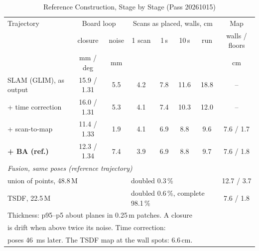 \begin{table}[!t]
\centering
\caption{Reference Construction, Stage by Stage (Pass 20261015)}
\label{tab:refmap_stages}
\footnotesize
\setlength{\tabcolsep}{2.5pt}
\begin{tabular}{lccccccc}
\toprule
Trajectory & \multicolumn{2}{c}{Board loop} & \multicolumn{4}{c}{Scans as placed, walls, cm} & Map \\
 & closure & noise & 1 scan & 1\,s & 10\,s & run & walls / floors \\
 & mm / deg & mm & & & & & cm \\
\midrule
SLAM (GLIM), as output    & 15.9 / 1.31 & 5.5 & 4.2 & 7.8 & 11.6 & 18.8 & -- \\
+ time correction         & 16.0 / 1.31 & 5.3 & 4.1 & 7.4 & 10.3 & 12.0 & -- \\
\quad + scan-to-map       & 11.4 / 1.33 & 1.9 & 4.1 & 6.9 & 8.8  & 9.6  & 7.6 / 1.7 \\
\quad \textbf{+ BA (ref.)} & 12.3 / 1.34 & 7.4 & 3.9 & 6.9 & 8.8 & 9.7  & 7.6 / 1.8 \\
\midrule
\multicolumn{8}{l}{\emph{Fusion, same poses (reference trajectory)}} \\
\multicolumn{3}{l}{\quad union of points, 48.8\,M} & \multicolumn{4}{l}{doubled 0.3\,\%} & 12.7 / 3.7 \\
\multicolumn{3}{l}{\quad TSDF, 22.5\,M} & \multicolumn{4}{l}{doubled 0.6\,\%, complete 98.1\,\%} & 7.6 / 1.8 \\
\bottomrule
\multicolumn{8}{l}{Thickness: p95--p5 about planes in 0.25\,m patches. A closure}\\
\multicolumn{8}{l}{is drift when above twice its noise. Time correction:}\\
\multicolumn{8}{l}{poses \SI{46}{\milli\second} later. The TSDF map at the wall spots: 6.6\,cm.}
\end{tabular}
\end{table}
